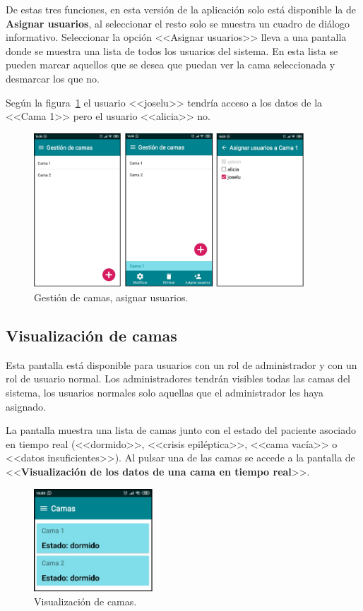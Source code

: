 De estas tres funciones, en esta versión de la aplicación solo está disponible la de \textbf{Asignar usuarios}, al seleccionar el resto solo se muestra un cuadro de diálogo informativo. Seleccionar la opción <<Asignar usuarios>> lleva a una pantalla donde se muestra una lista de todos los usuarios del sistema. En esta lista se pueden marcar aquellos que se desea que puedan ver la cama seleccionada y desmarcar los que no.

Según la figura~\ref{fig:gestiondecamas} el usuario <<joselu>> tendría acceso a los datos de la <<Cama 1>> pero el usuario <<alicia>> no. 

\begin{figure}[H]
	\centering
	\includegraphics[width=0.9\textwidth]{../img/gestiondecamas.png}
	\caption{Gestión de camas, asignar usuarios.}
	\label{fig:gestiondecamas}
\end{figure}

\subsection{Visualización de camas}

Esta pantalla está disponible para usuarios con un rol de administrador y con un rol de usuario normal. Los administradores tendrán visibles todas las camas del sistema, los usuarios normales solo aquellas que el administrador les haya asignado. 

La pantalla muestra una lista de camas junto con el estado del paciente asociado en tiempo real (<<dormido>>, <<crisis epiléptica>>, <<cama vacía>> o <<datos insuficientes>>). Al pulsar una de las camas se accede a la pantalla de <<\textbf{Visualización de los datos de una cama en tiempo real}>>. 

\begin{figure}[H]
	\centering
	\includegraphics[width=0.4\textwidth]{../img/visualizaciondecamas.png}
	\caption{Visualización de camas.}
	\label{fig:visualizaciondecamas}
\end{figure}

